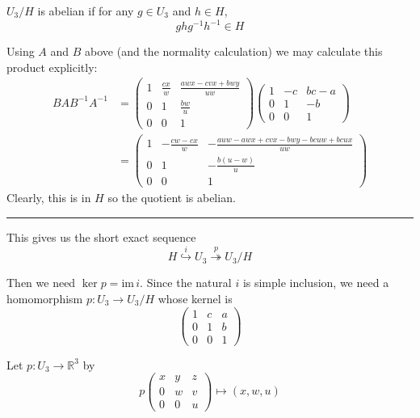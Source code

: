 \documentclass[12pt]{article}
\newcommand{\R}{\mathbb{R}}
\newcommand{\im}{\text{im}\,}
\begin{document}
        $U_3/H$ is abelian if for any $g \in U_3$ and $h \in H$, 
        \[ghg^{-1}h^{-1} \in H\]

        Using $A$ and $B$ above (and the normality calculation) we may calculate this product explicitly:
        \begin{align*} 
            BAB^{-1}A^{-1} &= \begin{pmatrix}
                1 & \frac{cx}{w} & \frac{awx - cvx + bwy}{uw}\\ 
                0 & 1 & \frac{bw}{u}\\
                0 & 0 & 1
            \end{pmatrix} \begin{pmatrix}
                1 & -c & bc - a\\ 
                0 & 1 & -b\\
                0 & 0 & 1
            \end{pmatrix}\\ 
            &= \begin{pmatrix}
                1 & -\frac{cw - cx}{w} & -\frac{auw - awx + cvx - bwy - bcuw + bcux}{uw}\\
                0 & 1 & -\frac{b(u - w)}{u}\\
                0 & 0 & 1
            \end{pmatrix}
        \end{align*} 
        Clearly, this is in $H$ so the quotient is abelian.

        \vspace*{10pt}
        \hrule 
        \vspace*{10pt}

        This gives us the short exact sequence 
        \[H \overset{i}{\hookrightarrow} U_3 \overset{p}{\twoheadrightarrow} U_3/H\]
        
        Then we need $\ker p = \im i$. Since the natural $i$ is simple inclusion, we need a homomorphism $p: U_3 \to U_3/H$ whose kernel is 
        \[\begin{pmatrix}
            1 & c & a\\
            0 & 1 & b\\
            0 & 0 & 1
        \end{pmatrix}\]

        Let $p: U_3 \to \R^3$ by 
        \[p\begin{pmatrix}
            x & y & z\\ 
            0 & w & v\\ 
            0 & 0 & u
        \end{pmatrix} \mapsto (x, w, u)\]
\end{document}
